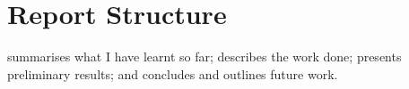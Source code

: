 \section{Report Structure}
\label{sec:intro-structure}


 summarises what I have learnt so far; 
describes the work done;  presents preliminary results;
and  concludes and outlines future work.
